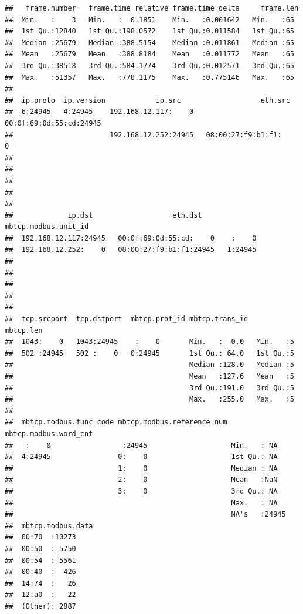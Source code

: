 \documentclass[]{article}
\begin{document}
\begin{verbatim}
##   frame.number   frame.time_relative frame.time_delta     frame.len 
##  Min.   :    3   Min.   :  0.1851    Min.   :0.001642   Min.   :65  
##  1st Qu.:12840   1st Qu.:198.0572    1st Qu.:0.011584   1st Qu.:65  
##  Median :25679   Median :388.5154    Median :0.011861   Median :65  
##  Mean   :25679   Mean   :388.8184    Mean   :0.011772   Mean   :65  
##  3rd Qu.:38518   3rd Qu.:584.1774    3rd Qu.:0.012571   3rd Qu.:65  
##  Max.   :51357   Max.   :778.1175    Max.   :0.775146   Max.   :65  
##                                                                     
##  ip.proto  ip.version            ip.src                   eth.src     
##  6:24945   4:24945    192.168.12.117:    0   00:0f:69:0d:55:cd:24945  
##                       192.168.12.252:24945   08:00:27:f9:b1:f1:    0  
##                                                                       
##                                                                       
##                                                                       
##                                                                       
##                                                                       
##             ip.dst                   eth.dst      mbtcp.modbus.unit_id
##  192.168.12.117:24945   00:0f:69:0d:55:cd:    0    :    0             
##  192.168.12.252:    0   08:00:27:f9:b1:f1:24945   1:24945             
##                                                                       
##                                                                       
##                                                                       
##                                                                       
##                                                                       
##  tcp.srcport  tcp.dstport  mbtcp.prot_id mbtcp.trans_id    mbtcp.len
##  1043:    0   1043:24945    :    0       Min.   :  0.0   Min.   :5  
##  502 :24945   502 :    0   0:24945       1st Qu.: 64.0   1st Qu.:5  
##                                          Median :128.0   Median :5  
##                                          Mean   :127.6   Mean   :5  
##                                          3rd Qu.:191.0   3rd Qu.:5  
##                                          Max.   :255.0   Max.   :5  
##                                                                     
##  mbtcp.modbus.func_code mbtcp.modbus.reference_num mbtcp.modbus.word_cnt
##   :    0                 :24945                    Min.   : NA          
##  4:24945                0:    0                    1st Qu.: NA          
##                         1:    0                    Median : NA          
##                         2:    0                    Mean   :NaN          
##                         3:    0                    3rd Qu.: NA          
##                                                    Max.   : NA          
##                                                    NA's   :24945        
##  mbtcp.modbus.data
##  00:70  :10273    
##  00:50  : 5750    
##  00:54  : 5561    
##  00:40  :  426    
##  14:74  :   26    
##  12:a0  :   22    
##  (Other): 2887
\end{verbatim}
\end{document}

